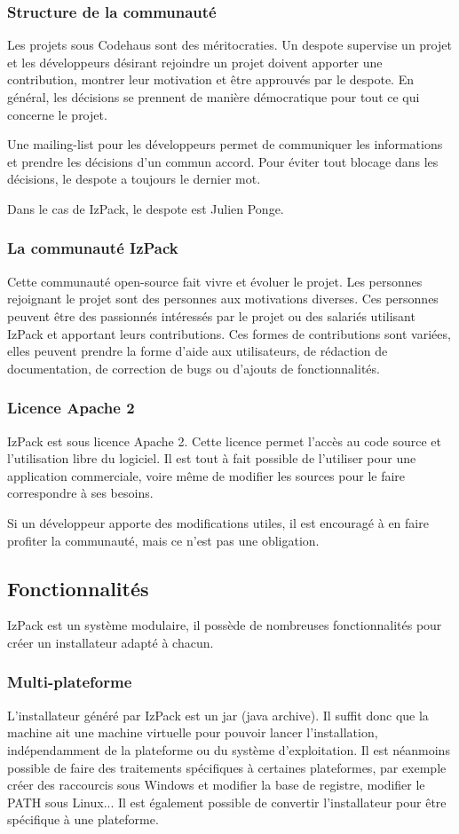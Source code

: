\subsubsection{Structure de la communauté}
Les projets sous Codehaus sont des méritocraties.
Un despote supervise un projet et
les développeurs désirant rejoindre un projet doivent apporter une contribution, montrer leur motivation et être approuvés par le despote.
En général, les décisions se prennent de manière démocratique pour tout ce qui concerne le projet.

Une mailing-list pour les développeurs permet de communiquer les informations et prendre les décisions d'un commun accord.
Pour éviter tout blocage dans les décisions, le despote a toujours le dernier mot.

Dans le cas de IzPack, le despote est Julien Ponge.
\subsubsection{La communauté IzPack}
Cette communauté open-source fait vivre et évoluer le projet. Les personnes rejoignant le projet sont des personnes aux motivations diverses.
Ces personnes peuvent être des passionnés intéressés par le projet ou des salariés utilisant IzPack et apportant leurs contributions.
Ces formes de contributions sont variées, 
elles peuvent prendre la forme d'aide aux utilisateurs, de rédaction de documentation, de correction de bugs ou d'ajouts de fonctionnalités.
\subsubsection{Licence Apache 2}
IzPack est sous licence Apache 2. Cette licence permet l'accès au code source et l'utilisation libre du logiciel.
Il est tout à fait possible de l'utiliser pour une application commerciale, voire même de modifier les sources pour le faire correspondre à ses besoins.

Si un développeur apporte des modifications utiles, il est encouragé à en faire profiter la communauté, mais ce n'est pas une obligation.
\subsection{Fonctionnalités}
IzPack est un système modulaire, il possède de nombreuses fonctionnalités pour créer un installateur adapté à chacun.
\subsubsection{Multi-plateforme}
L'installateur généré par IzPack est un jar (java archive).
Il suffit donc que la machine ait une machine virtuelle pour pouvoir lancer l'installation, indépendamment de la plateforme ou du système d'exploitation.
Il est néanmoins possible de faire des traitements spécifiques à certaines plateformes, par exemple créer des raccourcis sous Windows et modifier la base de registre, modifier le PATH sous Linux...
Il est également possible de convertir l'installateur pour être spécifique à une plateforme.

